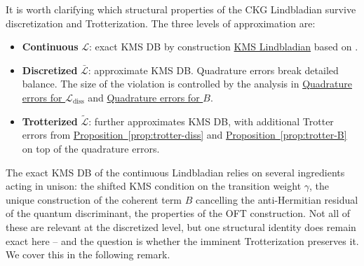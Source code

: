 It is worth clarifying which structural properties of the CKG Lindbladian survive discretization and Trotterization. The three levels of approximation are: 
\begin{itemize}
    \item \textbf{Continuous} $\mathcal{L}$: exact KMS DB by construction  \hyperref[sec:kms-lindbladian]{KMS Lindbladian} based on \cite[Theorem I.1]{chen2023efficient}.
    \item \textbf{Discretized} $\mathcal{\bar{L}}$: approximate KMS DB. Quadrature errors break detailed balance. The size of the violation is controlled by the analysis in \hyperref[sec:quad-errors-diss]{Quadrature errors for $\mathcal{L}_\text{diss}$} and \hyperref[sec:quad-errors-B]{Quadrature errors for $B$}.
    \item \textbf{Trotterized} $\mathcal{\tilde{L}}$: further approximates KMS DB, with additional Trotter errors from \hyperref[prop:trotter-diss]{Proposition~\ref*{prop:trotter-diss}} and \hyperref[prop:trotter-B]{Proposition~\ref*{prop:trotter-B}} on top of the quadrature errors.
\end{itemize}
The exact KMS DB of the continuous Lindbladian relies on several ingredients acting in unison: the shifted KMS condition on the transition weight $\gamma$, the unique construction of the coherent term $B$ cancelling the anti-Hermitian residual of the quantum discriminant, the properties of the OFT construction. Not all of these are relevant at the discretized level, but one structural identity does remain exact here -- and the question is whether the imminent Trotterization preserves it. We cover this in the following remark.

